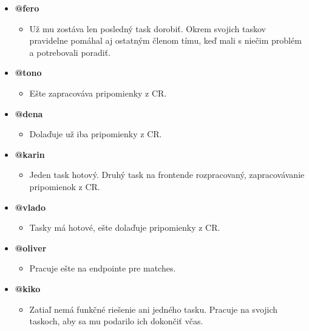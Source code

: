 \documentclass{article}
\begin{document}
    \begin{itemize}
        \item \textbf {@fero}
        \begin{itemize}
            \item Už mu zostáva len posledný task dorobiť. Okrem svojich taskov pravidelne pomáhal aj ostatným členom tímu, keď mali s niečim problém a potrebovali poradiť. 
        \end{itemize}
        \item \textbf {@tono}
        \begin{itemize}
            \item Ešte zapracováva pripomienky z CR.
        \end{itemize}
        \item \textbf {@dena}
        \begin{itemize}
            \item Dolaďuje už iba pripomienky z CR.
        \end{itemize}
        \item \textbf {@karin}
        \begin{itemize}
            \item Jeden task hotový. Druhý task na frontende rozpracovaný, zapracovávanie pripomienok z CR.
        \end{itemize}
        \item \textbf {@vlado}
        \begin{itemize}
            \item Tasky má hotové, ešte dolaďuje pripomienky z CR.
        \end{itemize}
        \item \textbf {@oliver}
        \begin{itemize}
            \item Pracuje ešte na endpointe pre matches. 
        \end{itemize}
        \item \textbf {@kiko}
        \begin{itemize}
            \item Zatiaľ nemá funkčné riešenie ani jedného tasku. Pracuje na svojich taskoch, aby sa mu podarilo ich dokončiť včas. 
        \end{itemize}
    \end{itemize}    
\end{document}
